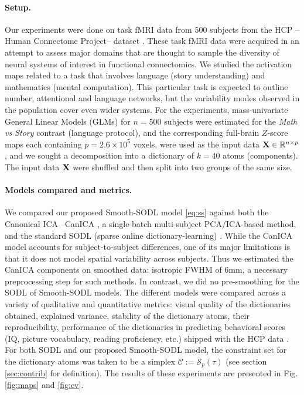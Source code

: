 \paragraph*{Setup.} Our experiments were done on task fMRI data from $500$ subjects
from the HCP --Human Connectome Project-- dataset
 \cite{VanEssen20122222}. These task fMRI data were acquired in an
attempt to assess major domains that are thought to sample the
diversity of neural systems of interest in functional connectomics.
We studied the activation maps related to a task that involves
language (story understanding) and mathematics (mental
computation). This particular task is expected to outline number, attentional and
language networks, but the variability modes observed in the
population cover even wider systems. For the experiments,
mass-univariate  General Linear Models (GLMs)  \cite{friston1995} for
$n=500$ subjects
were estimated for the \emph{Math vs Story} contrast (language
protocol), and the corresponding full-brain $Z$-score maps each
containing $p=2.6 \times 10^5$ voxels, were used as the input data $\mathbf{X} \in
\mathbb R^{n \times p}$,  and we
sought a decomposition into a dictionary of $k = 40$ atoms (components).
The input data $\mathbf{X}$ were shuffled and then split into two groups of the same
size.

\paragraph*{Models compared and metrics.} We compared our proposed Smooth-SODL model \eqref{eq:ss} against both the Canonical ICA --CanICA  \cite{varoquaux2010group}, a single-batch multi-subject PCA/ICA-based method, and the standard SODL (sparse online dictionary-learning)  \cite{mairal2010}. While the CanICA model accounts for subject-to-subject differences, one of
its major limitations is that it does not model spatial variability across
 subjects. Thus we estimated the CanICA components on smoothed data: isotropic FWHM of 6mm, a necessary preprocessing step for such methods. In contrast, we did no pre-smoothing for the SODL of Smooth-SODL models.
The different models were compared across a variety of qualitative and quantitative metrics: visual quality of the dictionaries obtained, explained variance, stability of the dictionary atoms, their reproducibility, performance of the dictionaries in predicting behavioral scores (IQ, picture vocabulary, reading proficiency, etc.) shipped with the HCP data  \cite{VanEssen20122222}. For both SODL \cite{mairal2010} and our proposed Smooth-SODL model, the constraint set for the dictionary atoms was taken to be a simplex $\mathcal C := \mathcal S_p(\tau)$ (see section \ref{sec:contrib} for definition). The results of these experiments are presented in Fig. \ref{fig:maps}
and \ref{fig:ev}.

